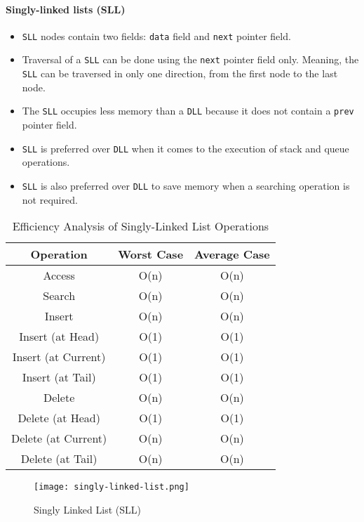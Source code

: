 \paragraph{Singly-linked lists (SLL)}
\begin{itemize}
    \item \lstinline{SLL} nodes contain two fields: \lstinline{data} field and \lstinline{next} pointer field.
    \item Traversal of a \lstinline{SLL} can be done using the \lstinline{next} pointer field only. Meaning, the \lstinline{SLL} can be traversed in only one direction, from the first node to the last node.
    \item The \lstinline{SLL} occupies less memory than a \lstinline{DLL} because it does not contain a \lstinline{prev} pointer field.
    \item \lstinline{SLL} is preferred over \lstinline{DLL} when it comes to the execution of stack and queue operations.
    \item \lstinline{SLL} is also preferred over \lstinline{DLL} to save memory when a searching operation is not required.
\end{itemize}
\begin{table}[h]
    \centering
    \caption{Efficiency Analysis of Singly-Linked List Operations}
    \label{tab:singly-linked-list-efficiency-analysis}
    \begin{tabular}{|c|c|c|}
        \hline
        Operation           & Worst Case & Average Case \\ \hline
        Access              & O(n)       & O(n)         \\ \hline
        Search              & O(n)       & O(n)         \\ \hline
        Insert              & O(n)       & O(n)         \\ \hline
        Insert (at Head)    & O(1)       & O(1)         \\ \hline
        Insert (at Current) & O(1)       & O(1)         \\ \hline
        Insert (at Tail)    & O(1)       & O(1)         \\ \hline
        Delete              & O(n)       & O(n)         \\ \hline
        Delete (at Head)    & O(1)       & O(1)         \\ \hline
        Delete (at Current) & O(n)       & O(n)         \\ \hline
        Delete (at Tail)    & O(n)       & O(n)         \\ \hline
    \end{tabular}
\end{table}
\begin{figure}[!htbp]
    \centering
    \texttt{[image: singly-linked-list.png]}
    \caption{Singly Linked List (SLL) \cite{vaghani_2023}}
    \label{fig:singly-linked-list}
\end{figure}

